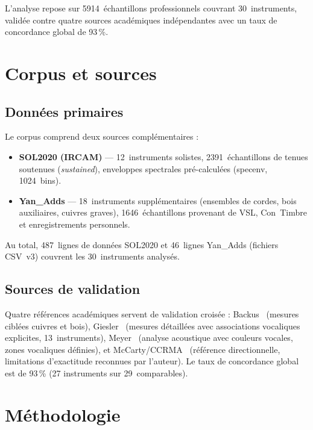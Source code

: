 \documentclass[11pt,a4paper]{article}
\begin{document}
L'analyse repose sur \num{5914}~échantillons professionnels couvrant
30~instruments, validée contre quatre sources académiques indépendantes
avec un taux de concordance global de 93\,\%.


\section{Corpus et sources}

\subsection{Données primaires}

Le corpus comprend deux sources complémentaires :

\begin{itemize}
  \item \textbf{SOL2020 (IRCAM)} --- 12~instruments solistes,
    \num{2391}~échantillons de tenues soutenues (\emph{sustained}),
    enveloppes spectrales pré-calculées (specenv, 1024~bins).
  \item \textbf{Yan\_Adds} --- 18~instruments supplémentaires (ensembles
    de cordes, bois auxiliaires, cuivres graves), \num{1646}~échantillons
    provenant de VSL, Con~Timbre et enregistrements personnels.
\end{itemize}

Au total, 487~lignes de données SOL2020 et 46~lignes Yan\_Adds (fichiers
CSV~v3) couvrent les 30~instruments analysés.

\subsection{Sources de validation}

Quatre références académiques servent de validation croisée :
Backus~\cite{backus1969} (mesures ciblées cuivres et bois),
Giesler~\cite{giesler1985} (mesures détaillées avec associations
vocaliques explicites, 13~instruments), Meyer~\cite{meyer2009} (analyse
acoustique avec couleurs vocales, zones vocaliques définies), et
McCarty/CCRMA~\cite{mccarty2003} (référence directionnelle, limitations
d'exactitude reconnues par l'auteur). Le taux de concordance global est
de 93\,\% (27 instruments sur 29~comparables).


\section{Méthodologie}
\end{document}
